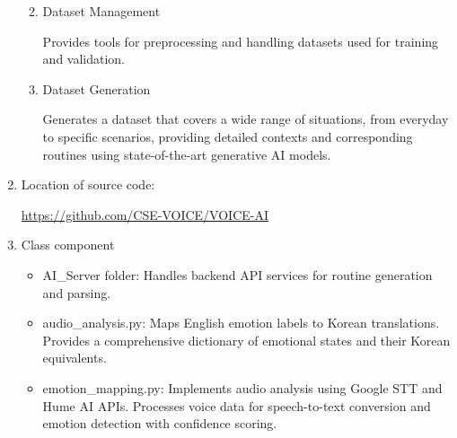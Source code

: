 \documentclass[conference]{IEEEtran}
\begin{document}
\begin{enumerate}[label=\arabic*]
\begin{enumerate}[label=\arabic*)]
        \vspace{1em}

        \item Dataset Management\par
        \vspace{0.3em}
        Provides tools for preprocessing and handling datasets used for training and validation.

        \vspace{1em}

        \item Dataset Generation\par
        \vspace{0.3em}
        Generates a dataset that covers a wide range of situations, from everyday to specific scenarios, providing detailed contexts and corresponding routines using state-of-the-art generative AI models.
    \end{enumerate}

    \vspace{1em}

    \item Location of source code:\par
    \vspace{0.3em}
    \href{https://github.com/CSE-VOICE/VOICE-AI}{https://github.com/CSE-VOICE/VOICE-AI}

    \vspace{1em}

    \item Class component\par
    \vspace{0.3em}

    \begin{itemize}[label=-]
        \item AI\_Server folder: Handles backend API services for routine generation and parsing.
        \vspace{0.7em}

        \item audio\_analysis.py: Maps English emotion labels to Korean translations. Provides a comprehensive dictionary of emotional states and their Korean equivalents.
        \vspace{0.7em}

        \item emotion\_mapping.py: Implements audio analysis using Google STT and Hume AI APIs. Processes voice data for speech-to-text conversion and emotion detection with confidence scoring.
        \vspace{0.7em}


\end{itemize}
\end{enumerate}
\end{document}
